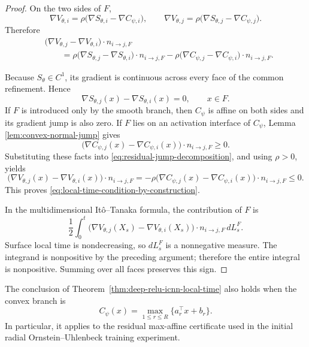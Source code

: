 \begin{proof}
On the two sides of \(F\),
\[
    \nabla V_{\theta,i}
    =
    \rho\bigl(\nabla S_{\theta,i}-\nabla C_{\psi,i}\bigr),
    \qquad
    \nabla V_{\theta,j}
    =
    \rho\bigl(\nabla S_{\theta,j}-\nabla C_{\psi,j}\bigr).
\]
Therefore
\begin{align}
    &\bigl(
        \nabla V_{\theta,j}-\nabla V_{\theta,i}
    \bigr)\cdot n_{i\to j,F}
    \\
    &\qquad=
    \rho
    \bigl(
        \nabla S_{\theta,j}-\nabla S_{\theta,i}
    \bigr)\cdot n_{i\to j,F}
    -
    \rho
    \bigl(
        \nabla C_{\psi,j}-\nabla C_{\psi,i}
    \bigr)\cdot n_{i\to j,F}.
    \label{eq:residual-jump-decomposition}
\end{align}

Because \(S_\theta\in C^1\), its gradient is continuous across every face of
the common refinement.  Hence
\[
    \nabla S_{\theta,j}(x)-\nabla S_{\theta,i}(x)=0,
    \qquad x\in F.
\]
If \(F\) is introduced only by the smooth branch, then
\(C_\psi\) is affine on both sides and its gradient jump is also zero.  If
\(F\) lies on an activation interface of \(C_\psi\), Lemma
\ref{lem:convex-normal-jump} gives
\[
    \bigl(
        \nabla C_{\psi,j}(x)-\nabla C_{\psi,i}(x)
    \bigr)\cdot n_{i\to j,F}
    \geq 0.
\]
Substituting these facts into \eqref{eq:residual-jump-decomposition}, and using
\(\rho>0\), yields
\[
    \bigl(
        \nabla V_{\theta,j}(x)-\nabla V_{\theta,i}(x)
    \bigr)\cdot n_{i\to j,F}
    =
    -\rho
    \bigl(
        \nabla C_{\psi,j}(x)-\nabla C_{\psi,i}(x)
    \bigr)\cdot n_{i\to j,F}
    \leq 0.
\]
This proves \eqref{eq:local-time-condition-by-construction}.

In the multidimensional It\^o--Tanaka formula, the contribution of \(F\) is
\[
    \frac12
    \int_0^t
    \bigl(
        \nabla V_{\theta,j}(X_s)-\nabla V_{\theta,i}(X_s)
    \bigr)
    \cdot n_{i\to j,F}\,dL_s^F.
\]
Surface local time is nondecreasing, so \(dL_s^F\) is a nonnegative measure.
The integrand is nonpositive by the preceding argument; therefore the entire
integral is nonpositive.  Summing over all faces preserves this sign.
\end{proof}

\begin{corollary}
\label{cor:max-affine-local-time}
The conclusion of Theorem~\ref{thm:deep-relu-icnn-local-time} also holds when
the convex branch is
\[
    C_\psi(x)=\max_{1\leq r\leq R}\{a_r^\top x+b_r\}.
\]
In particular, it applies to the residual max-affine certificate used in the
initial radial Ornstein--Uhlenbeck training experiment.
\end{corollary}


